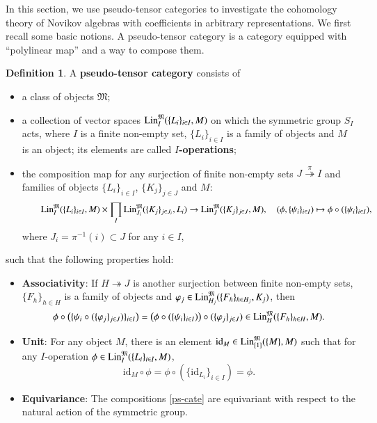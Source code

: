 \documentclass[12pt]{amsart}
\theoremstyle{definition}
\newtheorem{defi}[thm]{Definition}
\newcommand{\frkM}{\mathfrak M}
\newcommand{\id}{\mathrm{id}}
\newcommand{\lin}{{\rm Lin}}
\newcommand{\cc}{\circ}
\begin{document}
In this section, we   use pseudo-tensor categories to investigate the cohomology theory of Novikov algebras with coefficients in arbitrary representations. We first recall some basic notions.
A pseudo-tensor category is a category equipped with ``polylinear map'' and a way to compose them.
\begin{defi}\cite{BDK,BKV,BD}
A \textbf{pseudo-tensor category} consists of
\begin{itemize}
  \item a class of objects $\frkM$;
  \item a collection of vector spaces $\lin_I^\frkM(\{L_i\}_{i \in I}, M)$ on which the symmetric group $S_I$ acts, where $I$ is a finite non-empty set, $\{L_i\}_{i\in I}$ is a family of objects and $M$ is an object; its elements are called {\bf $I$-operations};
  \item the composition map for any surjection of finite non-empty sets $J\overset{\pi}\twoheadrightarrow I$ and families of objects $\{L_i\}_{i\in I}$, $\{K_j\}_{j\in J}$ and $M$:
  \begin{eqnarray}\label{ps-cate}
  \qquad\lin_I^\frkM(\{L_i\}_{i \in I},M)\times\prod_{I}\lin_{J_i}^\frkM(\{K_j\}_{j \in {J_i}},L_i)\to\lin_J^\frkM(\{K_j\}_{j \in J},M),\quad(\phi,\{\psi_i\}_{i\in I})\mapsto\phi\cc(\{\psi_i\}_{i\in I}),
  \end{eqnarray}
  where $J_i=\pi^{-1}(i)\subset J$ for any $i\in I$,
\end{itemize}
such that the following properties hold:
\begin{itemize}
  \item \textbf{Associativity}: If $H\twoheadrightarrow J$ is another surjection between finite non-empty sets, $\{F_{h}\}_{h\in H}$ is a family of objects and $\varphi_j\in\lin_{H_j}^\frkM(\{F_h\}_{h\in {H_j}},K_j)$, then
      $$\phi\cc\big(\{\psi_i\cc(\{\varphi_j\}_{j\in J})\}_{i\in I}\big)=\big(\phi\cc(\{\psi_i\}_{i\in I})\big)\cc(\{\varphi_j\}_{j\in J})\in\lin_H^\frkM(\{F_h\}_{h\in H}, M).$$
  \item \textbf{Unit}: For any object $M$, there is an element $\id_M \in \lin_{[1]}^\frkM(\{M\}, M)$ such that for any  $I$-operation $\phi\in \lin_I^\frkM(\{L_i\}_{i \in I}, M)$, $$\id_M\cc \phi = \phi\cc(\{\id_{L_i}\}_{i \in I}) = \phi.$$
  \item \textbf{Equivariance}: The compositions \eqref{ps-cate} are equivariant with respect to the natural action of the symmetric group.
\end{itemize}
\end{defi}
\end{document}
